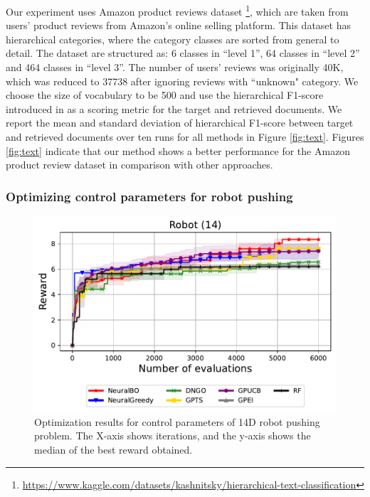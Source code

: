 Our experiment uses Amazon product reviews 
dataset \footnote{\url{https://www.kaggle.com/datasets/kashnitsky/hierarchical-text-classification}}, which are taken from users' product reviews from Amazon's online selling platform. This dataset has hierarchical categories, where the category classes are sorted from general to detail. The dataset are structured as: 6 classes in ``level 1'', 64 classes in ``level 2'' and 464 classes in ``level 3''. The number of users' reviews was originally 40K, which was reduced to 37738 after ignoring reviews with ``unknown" category. We choose the size of vocabulary to be 500 and use the hierarchical F1-score introduced in  \citet{kiritchenko2005functional} as a scoring metric for the target and retrieved documents. We report the mean and standard deviation of hierarchical F1-score between target and retrieved documents over ten runs for all methods in Figure \ref{fig:text}. Figures \ref{fig:text} indicate that our method shows a better performance for the Amazon product review dataset in comparison with other approaches. 

\subsubsection{Optimizing control parameters for robot pushing} 
\begin{figure}[H]
    \centering
    \includegraphics[width=\textwidth]{Figures/Neural-BO/Neural-BO_Robot_dim_14_round_6000.pdf}
    \vspace{-3mm}
    \caption{
    Optimization results for control parameters of 14D robot pushing problem. The X-axis shows iterations, and the y-axis shows the median of the best reward obtained.}
    \label{fig:robot_14D}
\end{figure}

